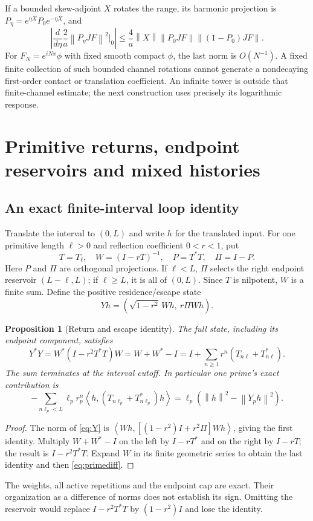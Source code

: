 \documentclass[11pt]{article}
\numberwithin{equation}{section}
\newtheorem{proposition}[theorem]{Proposition}
\theoremstyle{definition}
\theoremstyle{remark}
\newcommand{\norm}[1]{\left\lVert#1\right\rVert}
\newcommand{\ip}[2]{\left\langle#1,#2\right\rangle}
\begin{document}
If a bounded skew-adjoint $X$ rotates the range, its harmonic projection is $P_\eta=e^{\eta X}P_0e^{-\eta X}$, and
\begin{equation}
 \left|\frac d{d\eta}\frac2a\norm{P_\eta JF}^2\bigg|_{0}\right|
 \le\frac4a\norm X\norm{P_0JF}\norm{(1-P_0)JF}.
\end{equation}
For $F_N=e^{iNx}\phi$ with fixed smooth compact $\phi$, the last norm is $O(N^{-1})$. A fixed finite collection of such bounded channel rotations cannot generate a nondecaying first-order contact or translation coefficient. An infinite tower is outside that finite-channel estimate; the next construction uses precisely its logarithmic response.

\section{Primitive returns, endpoint reservoirs and mixed histories}
\label{sec:loops}
\subsection{An exact finite-interval loop identity}
Translate the interval to $(0,L)$ and write $h$ for the translated input. For one primitive length $\ell>0$ and reflection coefficient $0<r<1$, put
\begin{equation}
 T=T_\ell,\quad W=(I-rT)^{-1},\quad P=T^*T,\quad\Pi=I-P.
\end{equation}
Here $P$ and $\Pi$ are orthogonal projections. If $\ell<L$, $\Pi$ selects the right endpoint reservoir $(L-\ell,L)$; if $\ell\ge L$, it is all of $(0,L)$. Since $T$ is nilpotent, $W$ is a finite sum. Define the positive residence/escape state
\begin{equation}
 Yh=(\sqrt{1-r^2}\,Wh,\ r\Pi Wh).
 \label{eq:Y}
\end{equation}
\begin{proposition}[Return and escape identity]
The full state, including its endpoint component, satisfies
\begin{equation}
 Y^*Y=W^*(I-r^2T^*T)W
 =W+W^*-I
 =I+\sum_{n\ge1}r^n(T_{n\ell}+T_{n\ell}^*).
 \label{eq:poisson}
\end{equation}
The sum terminates at the interval cutoff. In particular one prime's exact contribution is
\begin{equation}
 -\sum_{n\ell_p<L}\ell_pr_p^n
 \ip{h}{(T_{n\ell_p}+T_{n\ell_p}^*)h}
 =\ell_p(\norm h^2-\norm{Y_ph}^2).
 \label{eq:primediff}
\end{equation}
\end{proposition}
\begin{proof}
The norm of \eqref{eq:Y} is $\ip{Wh}{[(1-r^2)I+r^2\Pi]Wh}$, giving the first identity. Multiply $W+W^*-I$ on the left by $I-rT^*$ and on the right by $I-rT$; the result is $I-r^2T^*T$. Expand $W$ in its finite geometric series to obtain the last identity and then \eqref{eq:primediff}.
\end{proof}
The weights, all active repetitions and the endpoint cap are exact. Their organization as a difference of norms does not establish its sign. Omitting the reservoir would replace $I-r^2T^*T$ by $(1-r^2)I$ and lose the identity.
\end{document}
